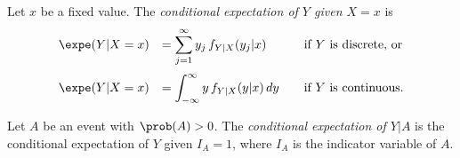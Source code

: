 \begin{definition}\label{def:cond_expe_x}
Let $x$ be a fixed value. The \emph{conditional expectation of $Y$ given $X=x$} is 
\[
\begin{array}{lll}
\expe(Y|X=x) & = \displaystyle\sum_{j=1}^{\infty} y_j\,f_{Y|X}(y_j|x)		& \quad\text{if $Y$ is discrete, or} \\[4ex]
\expe(Y|X=x) & = \displaystyle\int_{-\infty}^{\infty} y\,f_{Y|X}(y|x)\,dy	& \quad\text{if $Y$ is continuous.} 
\end{array}
\]
\end{definition}


\begin{definition}
Let $A$ be an event with $\prob(A)>0$. The \emph{conditional expectation of $Y|A$} is the conditional expectation of $Y$ given $I_A=1$, where $I_A$ is the indicator variable of $A$.
\end{definition}


